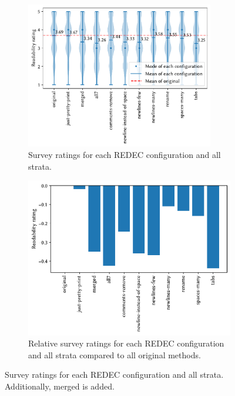 \documentclass[%
class=scrreprt,
chapterprefix=false,%
open=right,%
twoside=false,%
paper=a4,%
logofile={Logo\_zentral\_farbig\_EN.png},%
thesistype=master,%
UKenglish,%
]{se2thesis}
\theoremstyle{definition}
\newcommand{\rdh}{REDEC\xspace}
\begin{document}
	\begin{figure}[p]
		\centering
		\begin{subfigure}{\linewidth}
			\includegraphics[width=0.9\textwidth]{img/survey_ratings_violin_all_m.pdf}
			\caption{Survey ratings for each \rdh configuration and all strata.}
			\label{fig:survey_ratings_violin_all}
		\end{subfigure}
		\hfill
		\begin{subfigure}{\textwidth}
			\includegraphics[width=0.9\linewidth]{img/survey_ratings_bar_all_m.pdf}
			\caption{Relative survey ratings for each \rdh configuration and all strata compared to all original methods.}
			\label{fig:survey_ratings_bar_all}
		\end{subfigure}
		\caption{Survey ratings for each \rdh configuration and all strata. Additionally, merged is added.}
		\label{fig:survey_time_all}
	\end{figure}
	
\end{document}

